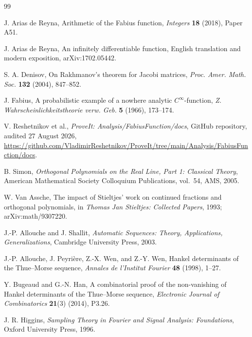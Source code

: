 \documentclass[11pt]{article}
\theoremstyle{definition}
\theoremstyle{remark}
\begin{document}
\begin{thebibliography}{99}

J. Arias de Reyna,
\newblock Arithmetic of the Fabius function,
\newblock \emph{Integers} \textbf{18} (2018), Paper A51.

J. Arias de Reyna,
\newblock An infinitely differentiable function,
\newblock English translation and modern exposition, arXiv:1702.05442.

S. A. Denisov,
\newblock On Rakhmanov's theorem for Jacobi matrices,
\newblock \emph{Proc. Amer. Math. Soc.} \textbf{132} (2004), 847--852.

J. Fabius,
\newblock A probabilistic example of a nowhere analytic \(C^\infty\)-function,
\newblock \emph{Z. Wahrscheinlichkeitstheorie verw. Geb.} \textbf{5} (1966), 173--174.

V. Reshetnikov et al.,
\newblock \emph{ProveIt: Analysis/FabiusFunction/docs},
\newblock GitHub repository, audited 27 August 2026,
\newblock \url{https://github.com/VladimirReshetnikov/ProveIt/tree/main/Analysis/FabiusFunction/docs}.

B. Simon,
\newblock \emph{Orthogonal Polynomials on the Real Line, Part 1: Classical Theory},
\newblock American Mathematical Society Colloquium Publications, vol.~54, AMS, 2005.

W. Van Assche,
\newblock The impact of Stieltjes' work on continued fractions and orthogonal polynomials,
\newblock in \emph{Thomas Jan Stieltjes: Collected Papers}, 1993; arXiv:math/9307220.



J.-P. Allouche and J. Shallit,
\newblock \emph{Automatic Sequences: Theory, Applications, Generalizations},
\newblock Cambridge University Press, 2003.

J.-P. Allouche, J. Peyri\`ere, Z.-X. Wen, and Z.-Y. Wen,
\newblock Hankel determinants of the Thue--Morse sequence,
\newblock \emph{Annales de l'Institut Fourier} \textbf{48} (1998), 1--27.

Y. Bugeaud and G.-N. Han,
\newblock A combinatorial proof of the non-vanishing of Hankel determinants of the
Thue--Morse sequence,
\newblock \emph{Electronic Journal of Combinatorics} \textbf{21}(3) (2014), P3.26.

J. R. Higgins,
\newblock \emph{Sampling Theory in Fourier and Signal Analysis: Foundations},
\newblock Oxford University Press, 1996.


\end{thebibliography}
\end{document}
